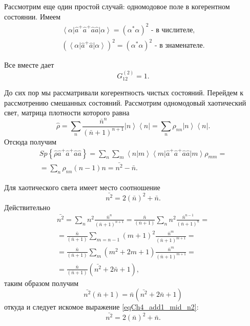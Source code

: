 Рассмотрим еще один простой случай: одномодовое поле в когерентном состоянии. Имеем
\begin{eqnarray}
\left<\alpha\right|\hat{a}^{+}\hat{a}^{+}\hat{a}\hat{a}\left|\alpha\right>
= \left(\alpha^{*}\alpha\right)^2
\mbox{ - в числителе},
\nonumber \\
\left(\left<\alpha\right|\hat{a}^{+}\hat{a}\left|\alpha\right>\right)^2
= \left(\alpha^{*}\alpha\right)^2
\mbox{ - в знаменателе}.
\nonumber
\end{eqnarray}

Все вместе дает
\[
G^{(2)}_{12} = 1.
\]

До сих пор мы рассматривали когерентность чистых состояний. Перейдем к
рассмотрению смешанных состояний. Рассмотрим одномодовый хаотический
свет, матрица плотности которого равна 
\[
\hat{\rho} = \sum_{n}\frac{\bar{n}^n}{\left(\bar{n} + 1\right)^{n +
    1}} \left|n\right>\left<n\right| = 
\sum_n\rho_{nn}\left|n\right>\left<n\right|.
\]
Отсюда получим
\begin{eqnarray}
Sp \left\{\hat{\rho}\hat{a}^{+}\hat{a}^{+}\hat{a}\hat{a}\right\} = 
\sum_{n}\sum_{m}\left<n\right|\left.m\right>\left<m\right|
\hat{a}^{+}\hat{a}^{+}\hat{a}\hat{a}
\left|m\right> \rho_{mm} = 
\nonumber \\
= \sum_{n}\rho_{nn}\left(n - 1\right)n = \bar{n^2} - \bar{n}.
\label{eqCh4_add1_sp}
\end{eqnarray}

Для хаотического света имеет место соотношение
\begin{equation}
\bar{n^2} = 2
\left(\bar{n}\right)^2 + \bar{n}.
\label{eqCh4_add1_mid_n2}
\end{equation}
Действительно
\begin{eqnarray}
\bar{n^2} = 
\sum_n n^2 \frac{\bar{n}^n}{\left(\bar{n} + 1\right)^{n + 1}} = 
\frac{\bar{n}}{\left(\bar{n} + 1\right)}\sum_n n^2
\frac{\bar{n}^{n-1}}{\left(\bar{n} + 1\right)^{n}} =
\nonumber \\
= 
\frac{\bar{n}}{\left(\bar{n} + 1\right)}\sum_{m = n -1} \left(m +
1\right)^2
\frac{\bar{n}^m}{\left(\bar{n} + 1\right)^{m + 1}} = 
\nonumber \\
= \frac{\bar{n}}{\left(\bar{n} + 1\right)}\sum_m
\left(m^2 + 2 m + 1\right)
\frac{\bar{n}^m}{\left(\bar{n} + 1\right)^{m + 1}} = 
\nonumber \\
=
\frac{\bar{n}}{\left(\bar{n} + 1\right)}\left(\bar{n^2} + 2 \bar{n} +
1\right),
\nonumber
\end{eqnarray}
таким образом получим
\begin{equation}
\bar{n^2}\left(\bar{n} + 1\right) = 
\bar{n}\left(\bar{n^2} + 2 \bar{n} + 1\right)
\nonumber
\end{equation}
откуда и следует искомое выражение \eqref{eqCh4_add1_mid_n2}:
\begin{equation}
\bar{n^2} = 2
\left(\bar{n}\right)^2 + \bar{n}.
\nonumber
\end{equation}

